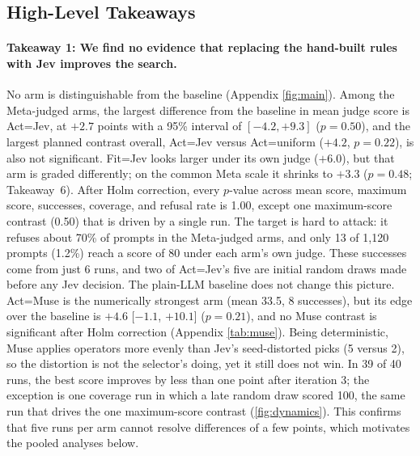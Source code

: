 \documentclass{article}
\newcommand{\ci}[2]{[$#1$, $#2$]}
\newcommand{\para}[1]{\paragraph{#1}}
\begin{document}
\subsection{High-Level Takeaways}

\para{Takeaway 1: We find no evidence that replacing the hand-built rules with Jev improves the search.}
No arm is distinguishable from the baseline (Appendix \autoref{fig:main}).
Among the Meta-judged arms, the largest difference from the baseline in mean judge score is Act=Jev, at $+2.7$ points with a 95\% interval of $[-4.2, +9.3]$ ($p = 0.50$), and the largest planned contrast overall, Act=Jev versus Act=uniform ($+4.2$, $p = 0.22$), is also not significant.
Fit=Jev looks larger under its own judge ($+6.0$), but that arm is graded differently; on the common Meta scale it shrinks to $+3.3$ ($p = 0.48$; Takeaway~6).
After Holm correction, every $p$-value across mean score, maximum score, successes, coverage, and refusal rate is 1.00, except one maximum-score contrast (0.50) that is driven by a single run.
The target is hard to attack: it refuses about 70\% of prompts in the Meta-judged arms, and only 13 of 1{,}120 prompts (1.2\%) reach a score of 80 under each arm's own judge.
These successes come from just 6 runs, and two of Act=Jev's five are initial random draws made before any Jev decision.
The plain-LLM baseline does not change this picture. Act=Muse is the numerically strongest arm (mean 33.5, 8 successes), but its edge over the baseline is $+4.6$ \ci{-1.1}{+10.1} ($p = 0.21$), and no Muse contrast is significant after Holm correction (Appendix \autoref{tab:muse}). Being deterministic, Muse applies operators more evenly than Jev's seed-distorted picks (5 versus 2), so the distortion is not the selector's doing, yet it still does not win.
In 39 of 40 runs, the best score improves by less than one point after iteration 3; the exception is one coverage run in which a late random draw scored 100, the same run that drives the one maximum-score contrast (\autoref{fig:dynamics}).
This confirms that five runs per arm cannot resolve differences of a few points, which motivates the pooled analyses below.
\end{document}
